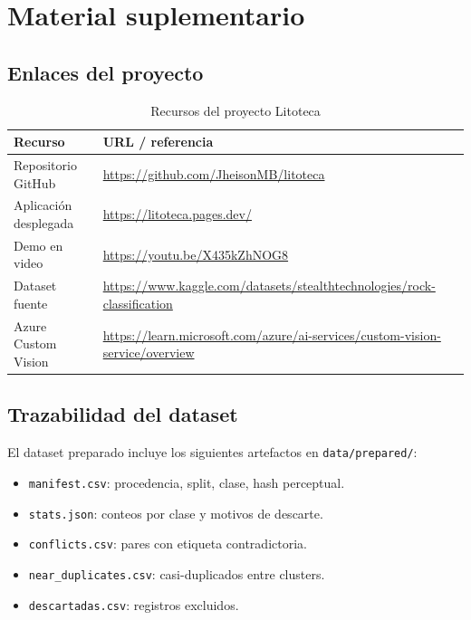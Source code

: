 \section{Material suplementario}
\label{app:supplementary}

\subsection{Enlaces del proyecto}

\begin{table}[H]
  \centering
  \caption{Recursos del proyecto Litoteca}
  \label{tab:recursos}
  \begin{tabular}{@{}p{4.2cm}p{8.2cm}@{}}
    \toprule
    Recurso & URL / referencia \\
    \midrule
    Repositorio GitHub & \url{https://github.com/JheisonMB/litoteca} \\
    Aplicación desplegada & \url{https://litoteca.pages.dev/} \\
    Demo en video & \url{https://youtu.be/X435kZhNOG8} \\
    Dataset fuente & \url{https://www.kaggle.com/datasets/stealthtechnologies/rock-classification} \\
    Azure Custom Vision & \url{https://learn.microsoft.com/azure/ai-services/custom-vision-service/overview} \\
    \bottomrule
  \end{tabular}
\end{table}

\subsection{Trazabilidad del dataset}

El dataset preparado incluye los siguientes artefactos en \texttt{data/prepared/}:

\begin{itemize}
  \item \texttt{manifest.csv}: procedencia, split, clase, hash perceptual.
  \item \texttt{stats.json}: conteos por clase y motivos de descarte.
  \item \texttt{conflicts.csv}: pares con etiqueta contradictoria.
  \item \texttt{near\_duplicates.csv}: casi-duplicados entre clusters.
  \item \texttt{descartadas.csv}: registros excluidos.
\end{itemize}

